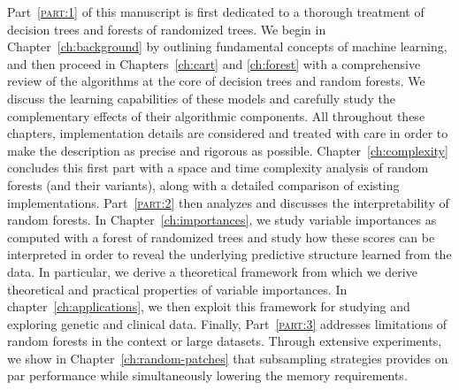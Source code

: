 Part~\textsc{\ref{part:1}} of this manuscript is first dedicated to a thorough
treatment of decision trees and forests of randomized trees. We begin in
Chapter~\ref{ch:background} by outlining fundamental concepts of machine
learning, and then proceed in Chapters~\ref{ch:cart} and \ref{ch:forest} with a
comprehensive review of the algorithms at the core of decision trees and random
forests. We discuss the learning capabilities of these models and carefully
study the complementary effects of their algorithmic components. All throughout
these chapters, implementation details are considered and treated with care in
order to make the description as precise and rigorous as possible.
Chapter~\ref{ch:complexity} concludes this first part with a space and time
complexity analysis of random forests (and their variants), along with a
detailed comparison of existing implementations. Part~\textsc{\ref{part:2}}
then analyzes and discusses the interpretability of random forests. In
Chapter~\ref{ch:importances}, we study variable importances as computed with a
forest of randomized trees and study how these scores can be interpreted in order to
reveal the underlying predictive structure learned from the data. In
particular, we derive a theoretical framework from which we derive theoretical
and practical properties of variable importances. In
chapter~\ref{ch:applications}, we then exploit this framework for studying and
exploring genetic and clinical data. Finally, Part~\textsc{\ref{part:3}}
addresses limitations of random forests in the context or large datasets.
Through extensive experiments, we show in Chapter~\ref{ch:random-patches} that
subsampling strategies provides on par performance while simultaneously
lowering the memory requirements.

